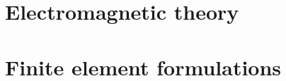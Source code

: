 \documentclass[a4paper,english,11pt,twoside,openright]{Contents/Styles/tesisupc}
\begin{document}
\appendix


\chapter{Electromagnetic theory}\label{chEMTheory}




\chapter{Finite element formulations}\label{chFEMForms}








\end{document}
